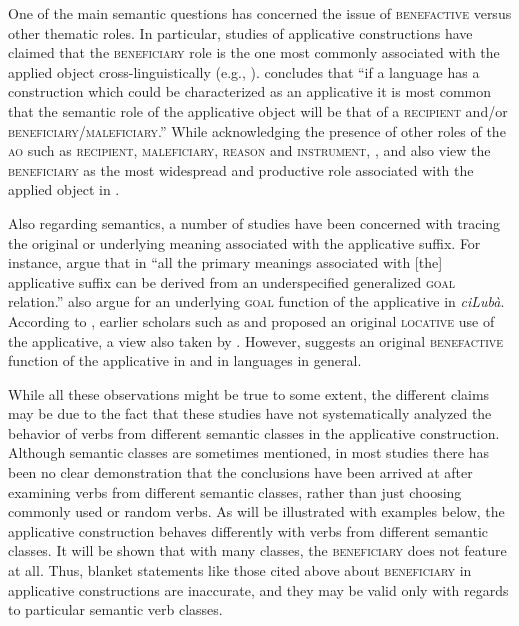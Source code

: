 \documentclass[output=paper]{langsci/langscibook}
\begin{document}
One of the main semantic questions has concerned the issue of \textsc{benefactive} versus other thematic roles. In particular, studies of applicative constructions have claimed that the \textsc{beneficiary} role is the one most commonly associated with the applied object cross-linguistically (e.g., \citealt{Peterson2007,Polinsky2008,KittilaZuniga2010}). \citet[40]{Peterson2007} concludes that “if a language has a construction which could be characterized as an applicative it is most common that the semantic role of the applicative object will be that of a \textsc{recipient} and/or \textsc{beneficiary}/\textsc{maleficiary.”} While acknowledging the presence of other roles of the \textsc{ao} such as \textsc{recipient}, \textsc{maleficiary}, \textsc{reason} and \textsc{instrument}, \citet{Schadeberg2003}, \citet[101]{deKindBostoen2012} and  \citet[1]{MartenKula2014} also view the \textsc{beneficiary} as the most widespread and productive role associated with the applied object in . 

Also regarding semantics, a number of studies have been concerned with tracing the original or underlying meaning associated with the applicative suffix. For instance, \citet[3]{CannMabugu2007} argue that in  “all the primary meanings associated with [the] applicative suffix can be derived from an underspecified generalized \textsc{goal} relation.”   \citet{deKindBostoen2012} also argue for an underlying \textsc{goal} function of the applicative in \textit{ciLubà}. According to \citet{Trithart1983}, earlier scholars such as \citet{Endemann1876,vanEeden1956} and  \citet{KahlerMeyer1966} proposed an original \textsc{locative} use of the applicative, a view also taken by \citet[74]{Schadeberg2003}. However, \citet[75]{Trithart1983} suggests an original \textsc{benefactive} function of the applicative in  and in  languages in general. 

While all these observations might be true to some extent, the different claims may be due to the fact that these studies have not systematically analyzed the behavior of verbs from different semantic classes in the applicative construction. Although semantic classes are sometimes mentioned, in most studies there has been no clear demonstration that the conclusions have been arrived at after examining verbs from different semantic classes, rather than just choosing commonly used or random verbs. As will be illustrated with  examples below, the applicative construction behaves differently with verbs from different semantic classes. It will be shown that with many classes, the \textsc{beneficiary} does not feature at all. Thus, blanket statements like those cited above about \textsc{beneficiary} in applicative constructions are inaccurate, and they may be valid only with regards to particular semantic verb classes.
\end{document}
